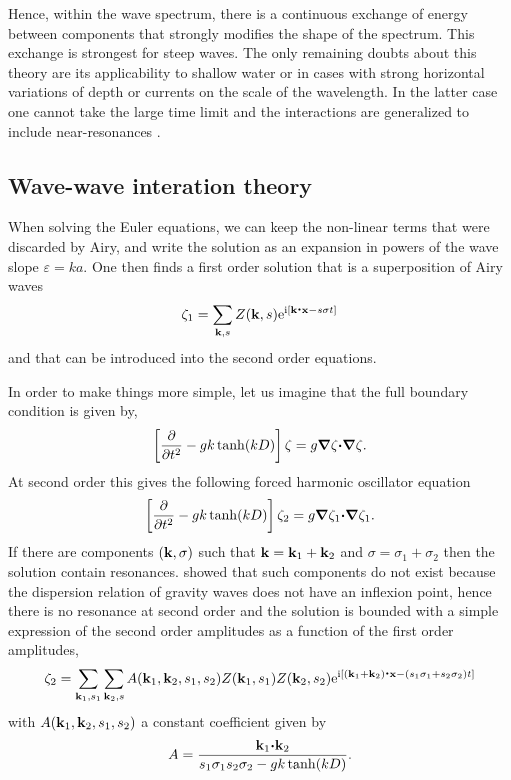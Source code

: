 Hence, within the wave spectrum, there is a continuous exchange of energy between components that strongly modifies the shape of the spectrum. This exchange is 
strongest for steep waves. The only remaining doubts about this theory are its applicability to shallow water or in cases with strong horizontal variations of depth or currents on the scale of the wavelength. In the latter case one cannot take the large time limit and the interactions are generalized to include near-resonances \citep{Stiassnie2004,Annenkov&Shrira2006}.




\subsection{Wave-wave interation theory}
When solving the Euler equations, we can keep the non-linear terms that were discarded by Airy, 
and write the solution as an expansion in powers of the wave slope $\varepsilon = k a $.  One then finds a first order solution that is a superposition of Airy waves
\begin{equation}
 \zeta_1=\sum_{\mathbf{k},s} Z(\mathbf{k},s) \mathrm{e}^{\mathrm{i} \left[\mathbf{k} \mbox{\boldmath $\cdot$} \mathbf{x} -s \sigma t\right]}
\end{equation}
and that can be introduced into the second order equations. 

In order to make things more simple, let us imagine that the full boundary condition is given by, 
\begin{equation}
\left[ \frac{\partial }{\partial t^2} - g k \tanh(kD) \right]\zeta  = g \mbox{\boldmath $\nabla$} \zeta \mbox{\boldmath $\cdot$} \mbox{\boldmath $\nabla$} \zeta.
\end{equation}
At second order this gives the following forced harmonic oscillator equation 
\begin{equation}
\left[ \frac{\partial }{\partial t^2} - g k \tanh(kD) \right]\zeta_2  = g \mbox{\boldmath $\nabla$} \zeta_1 \mbox{\boldmath $\cdot$} \mbox{\boldmath $\nabla$} \zeta_1.
\end{equation}
If there are components $(\mathbf{k},\sigma)$ such that $\mathbf{k}=\mathbf{k}_1+\mathbf{k}_2$ and $\sigma=\sigma_1+\sigma_2$ then the solution contain resonances. \cite{Phillips1960} showed
that such components do not exist because the dispersion relation of gravity waves does not have an inflexion point, hence there is no resonance at second order 
and the solution is bounded with a simple expression of the second order amplitudes as a function of the first order amplitudes, 
\begin{equation}
 \zeta_2=\sum_{\mathbf{k}_1,s_1} \sum_{\mathbf{k}_2,s} A (\mathbf{k}_1,\mathbf{k}_2,s_1,s_2) Z(\mathbf{k}_1,s_1)  Z(\mathbf{k}_2,s_2)  
\mathrm{e}^{\mathrm{i} \left[(\mathbf{k}_1 + \mathbf{k}_2) \mbox{\boldmath $\cdot$} \mathbf{x} -(s_1 \sigma_1+s_2 \sigma_2) t\right]} \label{zeta2}
\end{equation}
with $A (\mathbf{k}_1,\mathbf{k}_2,s_1,s_2)$ a constant coefficient given by
\begin{equation}
 A=\frac{\mathbf{k}_1 \mbox{\boldmath $\cdot$} \mathbf{k}_2 }{s_1 \sigma_1 s_2 \sigma_2 - g k \tanh(kD)}\label{eq:nl_A_simple}.
\end{equation}


